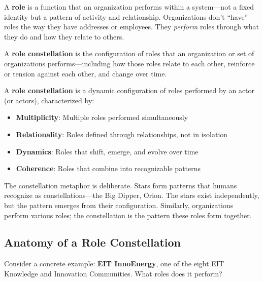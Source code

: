 \documentclass[../main.tex]{subfiles}
\begin{document}
A \textbf{role} is a function that an organization performs within a system---not a fixed identity but a pattern of activity and relationship. Organizations don't ``have'' roles the way they have addresses or employees. They \emph{perform} roles through what they do and how they relate to others.

A \textbf{role constellation} is the configuration of roles that an organization or set of organizations performs---including how those roles relate to each other, reinforce or tension against each other, and change over time.

\begin{roledef}
A \textbf{role constellation} is a dynamic configuration of roles performed by an actor (or actors), characterized by:
\begin{itemize}[leftmargin=*, itemsep=0.1em]
\item \textbf{Multiplicity}: Multiple roles performed simultaneously
\item \textbf{Relationality}: Roles defined through relationships, not in isolation
\item \textbf{Dynamics}: Roles that shift, emerge, and evolve over time
\item \textbf{Coherence}: Roles that combine into recognizable patterns
\end{itemize}
\end{roledef}

The constellation metaphor is deliberate. Stars form patterns that humans recognize as constellations---the Big Dipper, Orion. The stars exist independently, but the pattern emerges from their configuration. Similarly, organizations perform various roles; the constellation is the pattern these roles form together.

\subsection{Anatomy of a Role Constellation}

Consider a concrete example: \textbf{EIT InnoEnergy}, one of the eight EIT Knowledge and Innovation Communities. What roles does it perform?
\end{document}
